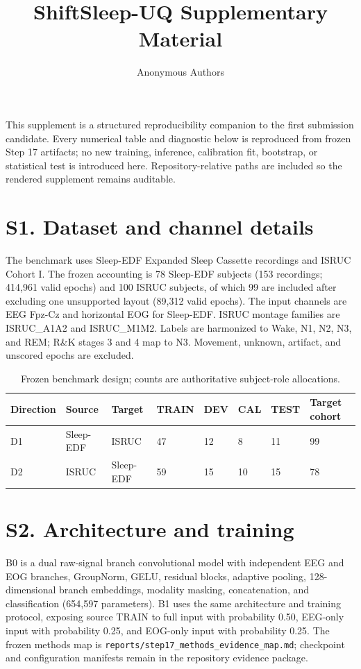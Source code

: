 \documentclass[10pt]{article}
\title{ShiftSleep-UQ Supplementary Material}
\author{Anonymous Authors}
\date{}
\begin{document}
\maketitle
\noindent This supplement is a structured reproducibility companion to the first submission candidate. Every numerical table and diagnostic below is reproduced from frozen Step 17 artifacts; no new training, inference, calibration fit, bootstrap, or statistical test is introduced here. Repository-relative paths are included so the rendered supplement remains auditable.

\section*{S1. Dataset and channel details}
The benchmark uses Sleep-EDF Expanded Sleep Cassette recordings and ISRUC Cohort I. The frozen accounting is 78 Sleep-EDF subjects (153 recordings; 414,961 valid epochs) and 100 ISRUC subjects, of which 99 are included after excluding one unsupported layout (89,312 valid epochs). The input channels are EEG Fpz-Cz and horizontal EOG for Sleep-EDF. ISRUC montage families are ISRUC\_A1A2 and ISRUC\_M1M2. Labels are harmonized to Wake, N1, N2, N3, and REM; R\&K stages 3 and 4 map to N3. Movement, unknown, artifact, and unscored epochs are excluded.

\begin{table}[h]\centering\small
\caption{Frozen benchmark design; counts are authoritative subject-role allocations.}\begin{tabular}{llllllll}\toprule
Direction & Source & Target & TRAIN & DEV & CAL & TEST & Target cohort\\\midrule
D1 & Sleep-EDF & ISRUC & 47 & 12 & 8 & 11 & 99\\
D2 & ISRUC & Sleep-EDF & 59 & 15 & 10 & 15 & 78\\\bottomrule\end{tabular}\end{table}

\section*{S2. Architecture and training}
B0 is a dual raw-signal branch convolutional model with independent EEG and EOG branches, GroupNorm, GELU, residual blocks, adaptive pooling, 128-dimensional branch embeddings, modality masking, concatenation, and classification (654,597 parameters). B1 uses the same architecture and training protocol, exposing source TRAIN to full input with probability 0.50, EEG-only input with probability 0.25, and EOG-only input with probability 0.25. The frozen methods map is \texttt{reports/step17\_methods\_evidence\_map.md}; checkpoint and configuration manifests remain in the repository evidence package.
\end{document}
